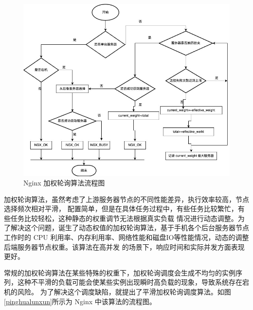 \begin{figure}[htb]
  \centering
  \includegraphics[width=\textwidth]{figures/round-flowchart.jpg}
  \caption{Nginx 加权轮询算法流程图}
  \label{weight_round}
\end{figure}

加权轮询算法，虽然考虑了上游服务器节点的不同性能差异，执行效率较高，节点选择频次相对平滑，
配置简单，但是在具体任务过程中，有些任务比较繁忙，有些任务比较轻松，这种静态的权重调节无法根据真实负载
情况进行动态调整。为了解决这个问题，诞生了动态权值的加权轮询算法，基于手机各个后台服务器节点工作时的 CPU
利用率、内存利用率、网络性能和磁盘IO等性能情况，动态的调整后端服务器节点权重\cite{谭畅2021云中心基于}。该算法在高并发
的场景下，响应时间和实际并发方面表现更好。

常规的加权轮询算法在某些特殊的权重下，加权轮询调度会生成不均匀的实例序列，这种不平滑的负载可能会使某些实例出现瞬时高负载的现象，导致系统存在宕机的风险。
为了解决这个调度缺陷，就提出了平滑加权轮询调度算法。如图\ref{pinghualunxun}所示为 Nginx 中该算法的流程图。

